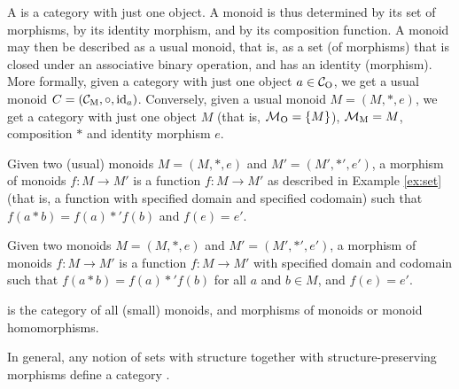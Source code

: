 \begin{example}
  [Monoids]




  \label{ex:monoid}


  A  is a category with just one object. A monoid is thus
  determined by its set of morphisms, by its identity morphism, and by
  its composition function. A monoid may then be described as a usual
  monoid, that is, as a set (of morphisms) that is closed under an
  associative binary operation, and has an identity (morphism). More
  formally, given a category  with just one object $a \in
  \mathcal{C}_{\operatorname{O}}$, we get a usual monoid $C = (\mathcal{C}_{\operatorname{M}}, \mathrel{\circ}, \operatorname{id}_{a})$.
  Conversely, given a usual monoid $M = (M, *, e)$, we get a category
   with just one object $M$ (that is, $\mathcal{M}_{\operatorname{O}} = \{M\}$),
  $\mathcal{M}_{\operatorname{M}} = M$, composition $*$ and identity morphism $e$.



  Given two (usual) monoids $M = (M, *, e)$ and $M' = (M', *', e')$, a
  morphism of monoids $f: M \to M'$ is a function $f: M \to M'$ as
  described in Example \ref{ex:set} (that is, a function with
  specified domain and specified codomain) such that $f(a * b) = f(a)
  *' f(b)$ and $f(e) = e'$.

  Given two monoids $M = (M, *, e)$ and $M' = (M', *', e')$, a
  morphism of monoids $f: M \to M'$ is a function $f: M \to M'$ with
  specified domain and codomain such that $f(a * b) = f(a) *' f(b)$
  for all $a$ and $b \in M$, and $f(e) = e'$.

   is the category of all (small) monoids, and morphisms of
  monoids or monoid homomorphisms.

\end{example}

\begin{remark}

  In general, any notion of sets with structure together with
  structure-preserving morphisms define a category
  \parencite[421]{poigne-1992}.

\end{remark}

